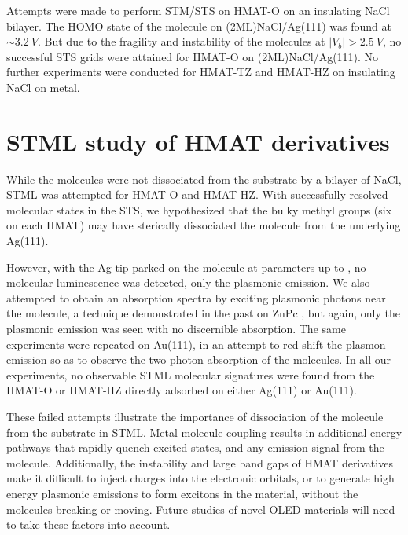 Attempts were made to perform \ac{STM}/\ac{STS} on HMAT-O on an insulating NaCl bilayer. The HOMO state of the molecule on (2ML)NaCl/Ag(111) was found at $\sim \SI{3.2}{V}$. But due to the fragility and instability of the molecules at $|V_b| >\SI{2.5}{V}$, no successful STS grids were attained for HMAT-O on (2ML)NaCl/Ag(111). No further experiments were conducted for HMAT-TZ and HMAT-HZ on insulating NaCl on metal.





\section{{STML} study of HMAT derivatives}

While the molecules were not dissociated from the substrate by a bilayer of NaCl, \ac{STML} was attempted for \ac{HMAT-O} and \ac{HMAT-HZ}. With successfully resolved molecular states in the \ac{STS}, we hypothesized that the bulky methyl groups (six on each \ac{HMAT}) may have sterically dissociated the molecule from the underlying Ag(111).

However, with the Ag tip parked on the molecule at parameters up to , no molecular luminescence was detected, only the plasmonic emission. We also attempted to obtain an absorption spectra by exciting plasmonic photons near the molecule, a technique demonstrated in the past on ZnPc \cite{zhang2017sub}, but again, only the plasmonic emission was seen with no discernible absorption. The same experiments were repeated on Au(111), in an attempt to red-shift the plasmon emission so as to observe the two-photon absorption of the molecules. In all our experiments, no observable \ac{STML} molecular signatures were found from the HMAT-O or HMAT-HZ directly adsorbed on either Ag(111) or Au(111). 

These failed attempts illustrate the importance of dissociation of the molecule from the substrate in \ac{STML}. Metal-molecule coupling results in additional energy pathways that rapidly quench excited states, and any emission signal from the molecule. Additionally, the instability and large band gaps of \ac{HMAT} derivatives make it difficult to inject charges into the electronic orbitals, or to generate high energy plasmonic emissions to form excitons in the material, without the molecules breaking or moving. Future studies of novel \ac{OLED} materials will need to take these factors into account.




